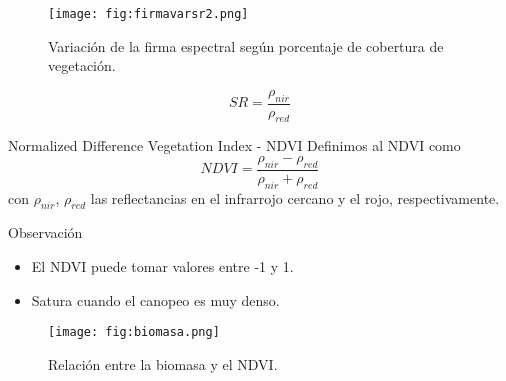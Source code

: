 
\begin{frame}{}
  \begin{figure}
    \centering
    \texttt{[image: fig:firmavarsr2.png]}
    \caption{Variación de la firma espectral según porcentaje de cobertura de vegetación.}
    \label{}
  \end{figure}
\end{frame}


\begin{frame}
\begin{equation}
    SR = \frac{\rho_{nir}}{\rho_{red}}
  \end{equation}
  \end{frame}

\begin{frame}{}
\begin{block}{Normalized Difference Vegetation Index - NDVI}
  Definimos al NDVI como
  \begin{equation}
    NDVI = \frac{\rho_{nir}-\rho_{red}}{\rho_{nir}+\rho_{red}}
  \end{equation}
  con $\rho_{nir}$, $\rho_{red}$ las reflectancias en el infrarrojo cercano y el rojo, respectivamente.
\end{block}\pause
\begin{block}{Observación}
    \begin{itemize}
        \item El NDVI puede tomar valores entre -1 y 1.
        \item Satura cuando el canopeo es muy denso.
    \end{itemize}
\end{block}
\end{frame}

\begin{frame}{}
  \begin{figure}
    \centering
    \texttt{[image: fig:biomasa.png]}
    \caption{Relación entre la biomasa y el NDVI.}
    \label{}
  \end{figure}
\end{frame}

